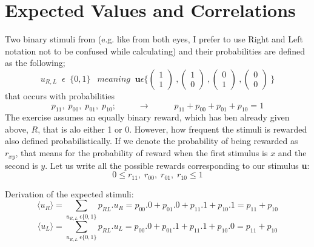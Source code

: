 \documentclass{article}
\begin{document}
\section{Expected Values and Correlations}
Two binary stimuli from (e.g. like from both eyes, I prefer to use Right and Left notation not to be confused while calculating) and their probabilities are defined as the following;
\begin{equation*}
u_{R,L} \;\; \epsilon \;\;\{0,1\} \ \;\;meaning \;\; \textbf{u} \epsilon \{ \left ( \begin{array}{cc} 1 \\ 1  \end{array} \right ) \ , \left ( \begin{array}{cc} 1 \\ 0  \end{array} \right ) \ , \left ( \begin{array}{cc} 0 \\ 1  \end{array} \right ) \ , \left ( \begin{array}{cc} 0 \\ 0  \end{array} \right ) \ \}
\end{equation*}
that occurs with probabilities
\begin{equation*}
 p_{11}, \; p_{00}, \; p_{01}, \;p_{10} ;\;\;\;\;\;\;\;\;\; \longrightarrow  \;\;\;\;\;\;\;\;\;\; p_{11}+p_{00}+p_{01}+p_{10}=1
\end{equation*}
The exercise assumes an equally binary reward, which has ben already given above, $R$, that is alo either 1 or 0. However, how frequent the stimuli is rewarded also defined probabilistically. If we denote the probability of being rewarded as $r_{xy}$, that means for the probability of reward when the first stimulus is $x$ and the second is $y$. Let us write all the possible rewards corresponding to our stimulus \textbf{u}:
\begin{equation*}
  0 \leq r_{11}, \; r_{00}, \; r_{01}, \;r_{10} \leq 1
\end{equation*}

Derivation of the expected stimuli:
\begin{equation*}
 \langle u_R  \rangle =\sum_{u_{R,L} \; \epsilon\{0,1\}} p_{RL}.u_R=p_{00}.0+p_{01}.0+p_{11}.1+p_{10}.1=p_{11}+p_{10}
\end{equation*}
\begin{equation*}
 \langle u_L  \rangle =\sum_{u_{R,L} \; \epsilon\{0,1\}} p_{RL}.u_L=p_{00}.0+p_{01}.1+p_{11}.1+p_{10}.0=p_{11}+p_{10}
\end{equation*}
\end{document}

